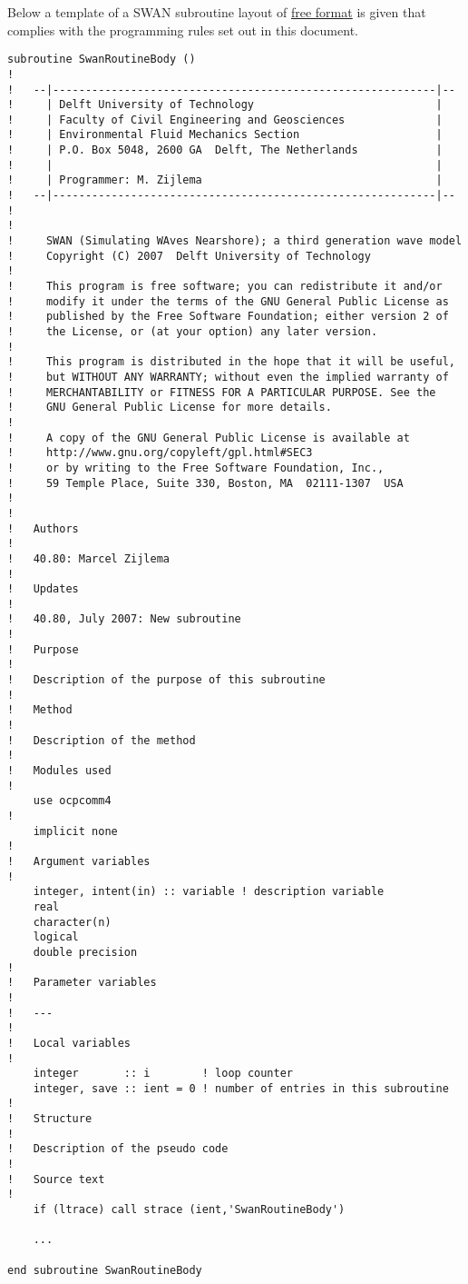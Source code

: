 \documentclass[12pt]{book}
\begin{document}
\newpage
\noindent
Below a template of a SWAN subroutine layout of \underline{free format} is given that complies with the programming rules set out in this document.
\\[2ex]
\begin{verbatim}
subroutine SwanRoutineBody ()
!
!   --|-----------------------------------------------------------|--
!     | Delft University of Technology                            |
!     | Faculty of Civil Engineering and Geosciences              |
!     | Environmental Fluid Mechanics Section                     |
!     | P.O. Box 5048, 2600 GA  Delft, The Netherlands            |
!     |                                                           |
!     | Programmer: M. Zijlema                                    |
!   --|-----------------------------------------------------------|--
!
!
!     SWAN (Simulating WAves Nearshore); a third generation wave model
!     Copyright (C) 2007  Delft University of Technology
!
!     This program is free software; you can redistribute it and/or
!     modify it under the terms of the GNU General Public License as
!     published by the Free Software Foundation; either version 2 of
!     the License, or (at your option) any later version.
!
!     This program is distributed in the hope that it will be useful,
!     but WITHOUT ANY WARRANTY; without even the implied warranty of
!     MERCHANTABILITY or FITNESS FOR A PARTICULAR PURPOSE. See the
!     GNU General Public License for more details.
!
!     A copy of the GNU General Public License is available at
!     http://www.gnu.org/copyleft/gpl.html#SEC3
!     or by writing to the Free Software Foundation, Inc.,
!     59 Temple Place, Suite 330, Boston, MA  02111-1307  USA
!
!
!   Authors
!
!   40.80: Marcel Zijlema
!
!   Updates
!
!   40.80, July 2007: New subroutine
!
!   Purpose
!
!   Description of the purpose of this subroutine
!
!   Method
!
!   Description of the method
!
!   Modules used
!
    use ocpcomm4
!
    implicit none
!
!   Argument variables
!
    integer, intent(in) :: variable ! description variable
    real
    character(n)
    logical
    double precision
!
!   Parameter variables
!
!   ---
!
!   Local variables
!
    integer       :: i        ! loop counter
    integer, save :: ient = 0 ! number of entries in this subroutine
!
!   Structure
!
!   Description of the pseudo code
!
!   Source text
!
    if (ltrace) call strace (ient,'SwanRoutineBody')

    ...

end subroutine SwanRoutineBody
\end{verbatim}
\end{document}
